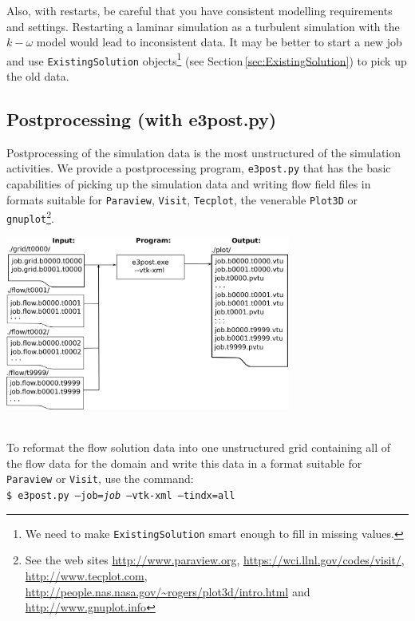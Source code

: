 \documentclass[12pt,a4paper,twoside]{article}
\begin{document}
\medskip
Also, with restarts, be careful that you have consistent modelling requirements and settings.
Restarting a laminar simulation as a turbulent simulation with the $k-\omega$ model would lead
to inconsistent data.
It may be better to start a new job and use \texttt{ExistingSolution} objects\footnote{We need to make \texttt{ExistingSolution} smart enough to fill in missing values.} (see Section\,\ref{sec:ExistingSolution}) to pick up the old data. 

\newpage
\subsection{Postprocessing (with e3post.py)} 
\label{sec:e3post}
%
Postprocessing of the simulation data is the most unstructured of the simulation activities.
We provide a postprocessing program, \texttt{e3post.py} that has the basic capabilities of picking up 
the simulation data and writing flow field files in formats suitable for 
\texttt{Paraview}, \texttt{Visit}, \texttt{Tecplot}, the venerable \texttt{Plot3D} or 
\texttt{gnuplot}\footnote{See the web sites  \url{http://www.paraview.org}, \url{https://wci.llnl.gov/codes/visit/},
\url{http://www.tecplot.com}, \url{http://people.nas.nasa.gov/\~rogers/plot3d/intro.html} and \url{http://www.gnuplot.info}}.
\vspace{0.25cm} \\
\centerline{\includegraphics[width=0.7\textwidth]{figs/post-process.png}}\\

\medskip
To reformat the flow solution data into one unstructured grid
containing all of the flow data for the domain and write this data in a format suitable
for \texttt{Paraview} or \texttt{Visit}, use the command:\\
\texttt{\$ e3post.py --job=\textit{job} --vtk-xml --tindx=all}\\ 
\end{document}
